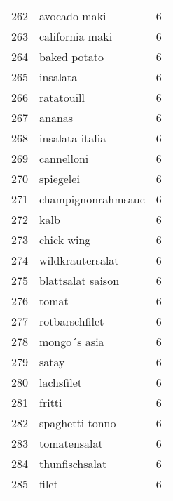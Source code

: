 \begin{tabular}{llr}
262  &                                       avocado maki &      6 \\
263  &                                    california maki &      6 \\
264  &                                       baked potato &      6 \\
265  &                                           insalata &      6 \\
266  &                                         ratatouill &      6 \\
267  &                                             ananas &      6 \\
268  &                                    insalata italia &      6 \\
269  &                                         cannelloni &      6 \\
270  &                                          spiegelei &      6 \\
271  &                                 champignonrahmsauc &      6 \\
272  &                                               kalb &      6 \\
273  &                                         chick wing &      6 \\
274  &                                   wildkrautersalat &      6 \\
275  &                                  blattsalat saison &      6 \\
276  &                                              tomat &      6 \\
277  &                                     rotbarschfilet &      6 \\
278  &                                       mongo´s asia &      6 \\
279  &                                              satay &      6 \\
280  &                                         lachsfilet &      6 \\
281  &                                             fritti &      6 \\
282  &                                    spaghetti tonno &      6 \\
283  &                                       tomatensalat &      6 \\
284  &                                     thunfischsalat &      6 \\
285  &                                              filet &      6 \\

\end{tabular}
